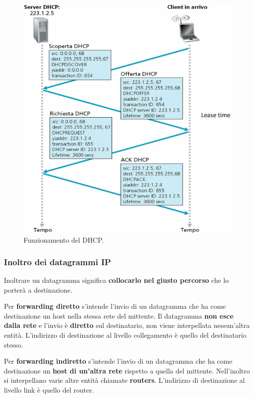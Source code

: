 \documentclass[11pt,a4paper,oneside]{book}
\theoremstyle{definition}
\begin{document}
\begin{figure}[!h]
	\includegraphics[scale=0.5]{Immagini/DHCP.png}
	\centering
	\caption{Funzionamento del DHCP.}
\end{figure}

\pagebreak

\subsubsection{Inoltro dei datagrammi IP}
Inoltrare un datagramma significa \textbf{collocarlo nel giusto percorso} che lo porterà a destinazione.

Per \textbf{forwarding diretto} s'intende l'invio di un datagramma che ha come destinazione un host nella stessa rete del mittente. Il datagramma \textbf{non esce dalla rete} e l'invio è \textbf{diretto} sul destinatario, non viene interpellata nessun'altra entità. L'indirizzo di destinazione al livello collegamento è quello del destinatario stesso.

Per \textbf{forwarding indiretto} s'intende l'invio di un datagramma che ha come destinazione un \textbf{host di un'altra rete} rispetto a quella del mittente. Nell'inoltro si interpellano varie altre entità chiamate \textbf{routers}. L'indirizzo di destinazione al livello link è quello del router.
\end{document}
